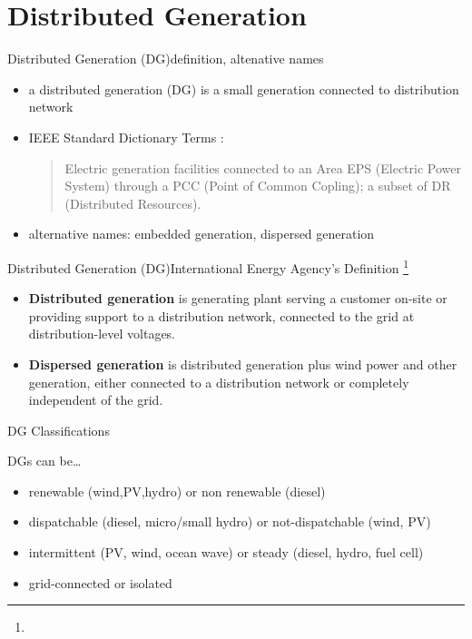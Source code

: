 \documentclass[10pt]{beamer}
\begin{document}
\section{Distributed Generation}


\begin{frame}{Distributed Generation (DG)}{definition, altenative names}
  \begin{itemize}
  \item
    a distributed generation (DG) is a small generation connected to distribution network
 \item IEEE Standard Dictionary Terms : %
  \begin{quote}
    Electric generation facilities connected to an Area EPS (Electric Power System) through a PCC (Point of Common Copling);
    a subset of DR (Distributed Resources).
   \end{quote}
   \item 
    alternative names: embedded generation, dispersed generation
   \end{itemize}
\end{frame}

\begin{frame}{Distributed Generation (DG)}{International Energy Agency's Definition \footnote{\tiny {}}}
\begin{itemize}
\item
\textbf{Distributed generation} is generating plant serving a customer on-site
or providing support to a distribution network, connected to the grid at
distribution-level voltages.
\item
\textbf{Dispersed generation} is distributed generation plus wind power and
other generation, either connected to a distribution network or completely
independent of the grid.
\end{itemize}
\end{frame}

\begin{frame}{DG Classifications}

  DGs can be\dots
  \begin{itemize}
  \item  renewable (wind,PV,hydro) or  non renewable (diesel)
  \item   dispatchable (diesel, micro/small hydro) or not-dispatchable (wind, PV)
  \item    intermittent (PV, wind, ocean wave) or        steady (diesel, hydro, fuel cell)
  \item   grid-connected or isolated
\end{itemize}
\end{frame}
\end{document}
